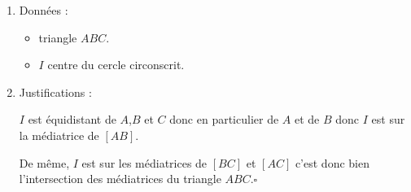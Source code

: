 \begin{changemargin}{0mm}{-15mm}
    \begin{preuve}
        \begin{enumerate}
            \item Données :
                  \begin{itemize}
                      \item  triangle $ABC$.
                      \item  $I$ centre du cercle circonscrit.
                  \end{itemize}
            \item Justifications :
                  \par
                  $I$ est équidistant de $A$,$B$ et $C$ donc en particulier de $A$ et de $B$ donc $I$ est sur la médiatrice de $[AB]$.
                  \par
                  De même, $I$ est sur les médiatrices de $[BC]$ et $[AC]$ c'est donc bien l'intersection des médiatrices du triangle $ABC$.$\square$
        \end{enumerate}
    \end{preuve}
\end{changemargin}

